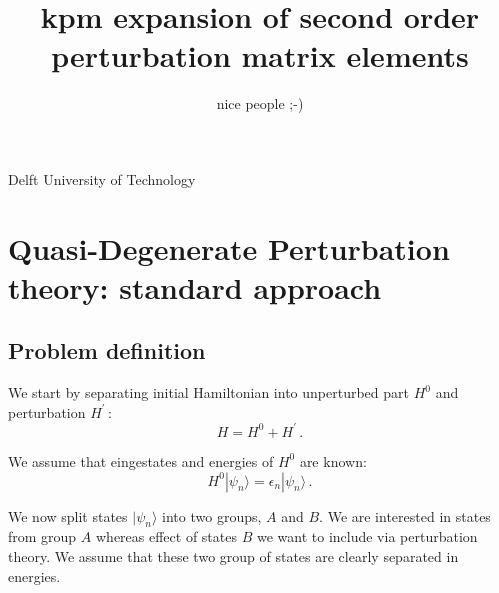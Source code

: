 \documentclass[10pt, onecolumn, aps, prb, superscriptaddress, floatfix, showpacs, notitlepage]{revtex4-1}
\newcommand{\ket}[1]{|#1\rangle}
\begin{document}
\author{nice people ;-)}
\affiliation
{Delft University of Technology}

\title{kpm expansion of second order perturbation matrix elements}

\maketitle

\section{Quasi-Degenerate Perturbation theory: standard approach}

\subsection{Problem definition}

We start by separating initial Hamiltonian into unperturbed part $H^0$ and perturbation $H^{\prime}\,$:
\begin{equation}
H = H^{0} + H^{\prime} \,.
\end{equation}

We assume that eingestates and energies of $H^{0}$ are known:
\begin{equation}
H^0 \ket{\psi_n} = \epsilon_n \ket{\psi_n} \,.
\end{equation}

We now split states $\ket{\psi_n}$ into two groups, $A$ and $B$.
We are interested in states from group $A$ whereas effect of states $B$ we want to include via perturbation theory.
We assume that these two group of states are clearly separated in energies.
\end{document}
